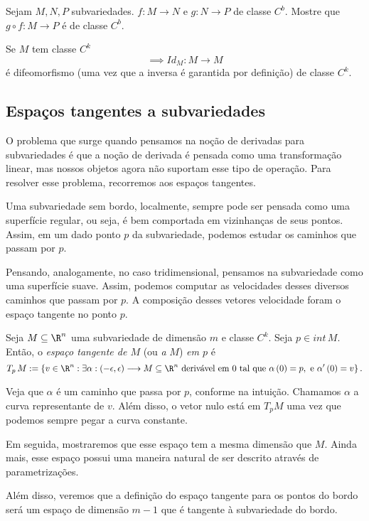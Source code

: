 \begin{problem}
    Sejam $M, N, P$ subvariedades. $f: M \longrightarrow N$ e $g: N \longrightarrow P$ de classe $C^{b}$. Mostre que $g\circ f : M \longrightarrow P$ é de classe $C^{b}$.
\end{problem}

\begin{remark}
    Se $M$ tem classe $C^{k}$ \[
    \implies Id_M : M \longrightarrow M
\] é difeomorfismo (uma vez que a inversa é garantida por definição) de classe $C^{k}$.
\end{remark}

\subsection*{Espaços tangentes a subvariedades}

O problema que surge quando pensamos na noção de derivadas para subvariedades é que a noção de derivada é pensada como uma transformação linear, mas nossos objetos agora não suportam esse tipo de operação. Para resolver esse problema, recorremos aos espaços tangentes.

\begin{intuition}
    Uma subvariedade sem bordo, localmente, sempre pode ser pensada como uma superfície regular, ou seja, é bem comportada em vizinhanças de seus pontos. Assim, em um dado ponto $p$ da subvariedade, podemos estudar os caminhos que passam por $p$.

    Pensando, analogamente, no caso tridimensional, pensamos na subvariedade como uma superfície suave. Assim, podemos computar as velocidades desses diversos caminhos que passam por $p$. A composição desses vetores velocidade foram o espaço tangente no ponto $p$.
\end{intuition}

\begin{definition}
    Seja $M\subseteq\R^{n}$ uma subvariedade de dimensão $m$ e classe $C^{k}$. Seja $p \in int\, M$. Então, o \emph{espaço tangente de $M$} (ou \emph{a} $M$) \emph{em $p$} é \[
    T_p\, M := \left\{ v\in \R^{n}: \exists \alpha : \left( -\epsilon, \epsilon \right)  \longrightarrow M \subseteq\R^{n} \text{ derivável em 0 tal que }\alpha\left( 0 \right) = p,\text{ e }\alpha'\left( 0 \right) = v  \right\} 
    .\] 
\end{definition}
Veja que $\alpha$ é um caminho que passa por $p$, conforme na intuição. Chamamos $\alpha$ a curva representante de $v$. Além disso, o vetor nulo está em $T_p M$ uma vez que podemos sempre pegar a curva constante.

Em seguida, mostraremos que esse espaço tem a mesma dimensão que $M$. Ainda mais, esse espaço possui uma maneira natural de ser descrito através de parametrizações.

Além disso, veremos que a definição do espaço tangente para os pontos do bordo será um espaço de dimensão $m-1$ que é tangente à subvariedade do bordo.

